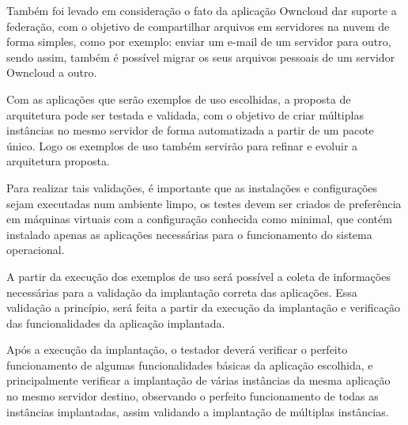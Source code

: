 Também foi levado em consideração o fato da  aplicação Owncloud dar suporte a federação,
com  o objetivo de compartilhar arquivos em servidores na nuvem de forma simples,
como por exemplo: enviar um e-mail de um servidor para outro, sendo assim,
também é possível migrar os seus arquivos pessoais de um servidor Owncloud a outro.

Com as aplicações que serão exemplos de uso escolhidas, a proposta de arquitetura
pode ser testada e validada, com o objetivo de criar múltiplas instâncias
no mesmo servidor de forma automatizada a partir de um pacote único. Logo os
exemplos de uso também servirão para refinar e evoluir a arquitetura proposta.

Para realizar tais validações, é importante que as instalações e configurações
sejam executadas num ambiente limpo, os testes devem ser criados de preferência
em máquinas virtuais com a configuração conhecida como minimal, que contém
instalado apenas as aplicações necessárias para o funcionamento do sistema operacional.

A partir da execução dos exemplos de uso será possível a coleta de informações
necessárias para a validação da implantação correta das aplicações. Essa
validação a princípio, será feita a partir da execução da implantação e
verificação das funcionalidades da aplicação implantada.

Após a execução da implantação, o testador deverá verificar o perfeito
funcionamento de algumas funcionalidades básicas da aplicação escolhida,
e principalmente verificar a implantação de várias instâncias da mesma
aplicação no mesmo servidor destino, observando o perfeito funcionamento de todas as
instâncias implantadas, assim validando a implantação de múltiplas instâncias.
